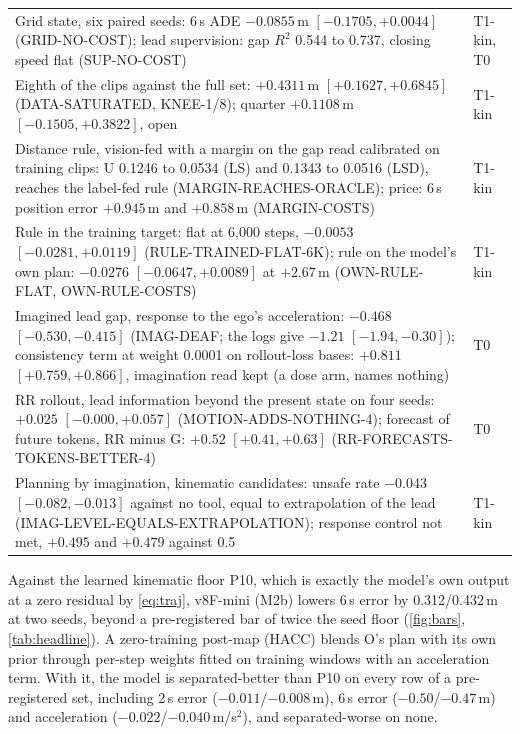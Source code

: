 \documentclass[10pt,twocolumn]{article}
\makeatletter
\theoremstyle{remark}
\renewcommand\paragraph{\@startsection{paragraph}{4}{\z@}{1.6ex \@plus .5ex \@minus .2ex}{-1em}{\normalfont\normalsize\bfseries}}
\makeatother
\begin{document}
\begin{table}[!t]
\begin{tabularx}{\columnwidth}{@{}>{\raggedright\arraybackslash}Xl@{}}
Grid state, six paired seeds: 6\,s ADE $-0.0855$\,m $[-0.1705,+0.0044]$ (GRID-NO-COST); lead supervision: gap $R^2$ 0.544 to 0.737, closing speed flat (SUP-NO-COST) & T1-kin, T0 \\
Eighth of the clips against the full set: $+0.4311$\,m $[+0.1627,+0.6845]$ (DATA-SATURATED, KNEE-1/8); quarter $+0.1108$\,m $[-0.1505,+0.3822]$, open & T1-kin \\
Distance rule, vision-fed with a margin on the gap read calibrated on training clips: U 0.1246 to 0.0534 (LS) and 0.1343 to 0.0516 (LSD), reaches the label-fed rule (MARGIN-REACHES-ORACLE); price: 6\,s position error $+0.945$\,m and $+0.858$\,m (MARGIN-COSTS) & T1-kin \\
Rule in the training target: flat at 6,000 steps, $-0.0053$ $[-0.0281,+0.0119]$ (RULE-TRAINED-FLAT-6K); rule on the model's own plan: $-0.0276$ $[-0.0647,+0.0089]$ at $+2.67$\,m (OWN-RULE-FLAT, OWN-RULE-COSTS) & T1-kin \\
Imagined lead gap, response to the ego's acceleration: $-0.468$ $[-0.530,-0.415]$ (IMAG-DEAF; the logs give $-1.21$ $[-1.94,-0.30]$); consistency term at weight 0.0001 on rollout-loss bases: $+0.811$ $[+0.759,+0.866]$, imagination read kept (a dose arm, names nothing) & T0 \\
RR rollout, lead information beyond the present state on four seeds: $+0.025$ $[-0.000,+0.057]$ (MOTION-ADDS-NOTHING-4); forecast of future tokens, RR minus G: $+0.52$ $[+0.41,+0.63]$ (RR-FORECASTS-TOKENS-BETTER-4) & T0 \\
Planning by imagination, kinematic candidates: unsafe rate $-0.043$ $[-0.082,-0.013]$ against no tool, equal to extrapolation of the lead (IMAG-LEVEL-EQUALS-EXTRAPOLATION); response control not met, $+0.495$ and $+0.479$ against 0.5 & T1-kin \\
\bottomrule
\end{tabularx}
\end{table}

\paragraph{The hierarchy beats its floor.} Against the learned kinematic floor P10, which is exactly the model's own output at a zero
residual by \cref{eq:traj}, v8F-mini (M2b) lowers 6\,s error by 0.312/0.432\,m at two seeds, beyond a pre-registered bar of twice the
seed floor (\cref{fig:bars}, \cref{tab:headline}). A zero-training post-map (HACC) blends O's plan with its own prior through
per-step weights fitted on training windows with an acceleration term. With it, the model is separated-better than P10 on every row of
a pre-registered set, including 2\,s error ($-0.011$/$-0.008$\,m), 6\,s error ($-0.50$/$-0.47$\,m) and acceleration
($-0.022$/$-0.040$\,m/s$^2$), and separated-worse on none.
\end{document}
